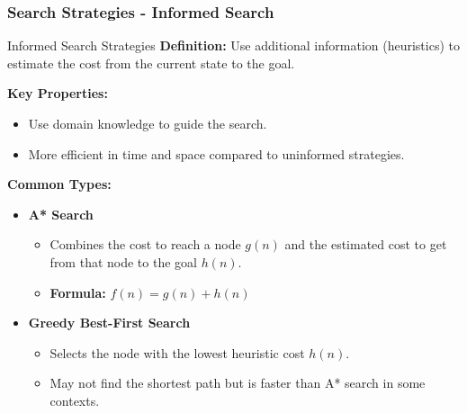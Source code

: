 \documentclass[aspectratio=169]{beamer}
\begin{document}
\begin{frame}[fragile]
    \frametitle{Search Strategies - Informed Search}
    \begin{block}{Informed Search Strategies}
        \textbf{Definition:} Use additional information (heuristics) to estimate the cost from the current state to the goal.

        \textbf{Key Properties:}
        \begin{itemize}
            \item Use domain knowledge to guide the search.
            \item More efficient in time and space compared to uninformed strategies.
        \end{itemize}

        \textbf{Common Types:}
        \begin{itemize}
            \item \textbf{A* Search}
            \begin{itemize}
                \item Combines the cost to reach a node \(g(n)\) and the estimated cost to get from that node to the goal \(h(n)\).
                \item \textbf{Formula:} \( f(n) = g(n) + h(n) \)
            \end{itemize}
            \item \textbf{Greedy Best-First Search}
            \begin{itemize}
                \item Selects the node with the lowest heuristic cost \(h(n)\).
                \item May not find the shortest path but is faster than A* search in some contexts.
            \end{itemize}
        \end{itemize}
    \end{block}
\end{frame}
\end{document}
